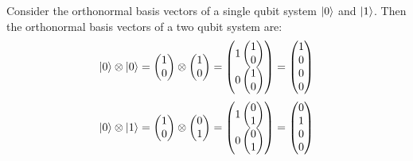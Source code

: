 \begin{example}
    Consider the orthonormal basis vectors of a single qubit system $\ket{0}$ and $\ket{1}$. Then the orthonormal basis vectors of a two qubit system are:
    \[ \ket{0} \otimes \ket{0} = \begin{pmatrix} 1 \\ 0 \end{pmatrix} \otimes \begin{pmatrix} 1 \\ 0 \end{pmatrix} = \begin{pmatrix} 1 \begin{pmatrix} 1 \\ 0 \end{pmatrix} \\ 0 \begin{pmatrix} 1 \\ 0 \end{pmatrix} \end{pmatrix} = \begin{pmatrix} 1 \\ 0 \\ 0 \\ 0 \end{pmatrix} \]
    \[ \ket{0} \otimes \ket{1} = \begin{pmatrix} 1 \\ 0 \end{pmatrix} \otimes \begin{pmatrix} 0 \\ 1 \end{pmatrix} = \begin{pmatrix} 1 \begin{pmatrix} 0 \\ 1 \end{pmatrix} \\ 0 \begin{pmatrix} 0 \\ 1 \end{pmatrix} \end{pmatrix} = \begin{pmatrix} 0 \\ 1 \\ 0 \\ 0 \end{pmatrix} \]

\end{example}
